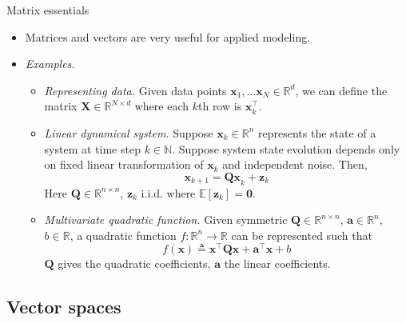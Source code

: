\documentclass{beamer}
\numberwithin{equation}{section}
\begin{document}
\begin{frame}{Matrix essentials}
    \begin{itemize}
        \item
        Matrices and vectors are very useful for applied modeling.

        \item
        \textit{Examples.}
        \begin{itemize}
            \item
            \textit{Representing data.} Given data points $ \mathbf{x}_1,
            \ldots \mathbf{x}_N \in \mathbb{R}^d $, we can define the matrix
            $ \mathbf{X} \in \mathbb{R}^{N \times d} $ where each $ k $th row
            is $ \mathbf{x}_k^\top $.

            \item
            \textit{Linear dynamical system.} Suppose $ \mathbf{x}_k \in
            \mathbb{R}^n $ represents the state of a system at time step
            $ k \in \mathbb{N} $. Suppose system state evolution depends only
            on fixed linear transformation of $ \mathbf{x}_k $ and
            independent noise. Then,
            \begin{equation*}
                \mathbf{x}_{k + 1} = \mathbf{Qx}_k + \mathbf{z}_k
            \end{equation*}
            Here $ \mathbf{Q} \in \mathbb{R}^{n \times n} $, $ \mathbf{z}_k $
            i.i.d. where $ \mathbb{E}[\mathbf{z}_k] = \mathbf{0} $.

            \item
            \textit{Multivariate quadratic function.} Given symmetric
            $ \mathbf{Q} \in \mathbb{R}^{n \times n} $, $ \mathbf{a} \in
            \mathbb{R}^n $, $ b \in \mathbb{R} $, a quadratic function $ f : \mathbb{R}^n
            \rightarrow \mathbb{R} $ can be represented such that
            \begin{equation*}
                f(\mathbf{x}) \triangleq \mathbf{x}^\top\mathbf{Qx} +
                \mathbf{a}^\top\mathbf{x} + b
            \end{equation*}
            $ \mathbf{Q} $ gives the quadratic coefficients, $ \mathbf{a} $
            the linear coefficients.
        \end{itemize}
    \end{itemize}
\end{frame}

\subsection{Vector spaces}
\end{document}
